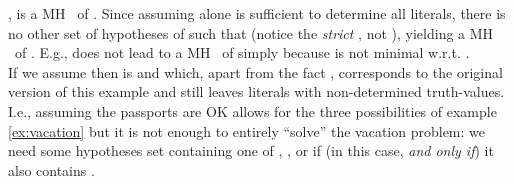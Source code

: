 \documentclass{llncs}
\begin{document}
{{			, is a MH \m\ of .
Since assuming  alone is sufficient to determine all literals, there is no other set of hypotheses  of 
			such that  (notice the \emph{strict} , not ), yielding a MH \m\ of .
			E.g.,  does not lead to a MH \m\ of  simply because  is not minimal w.r.t.
			.\\			
			If we assume  then  is
			and 
			which, apart from the fact , corresponds to the original version of this example and still leaves literals with non-determined
			truth-values.
			I.e., assuming the passports are OK allows for the three possibilities of example \ref{ex:vacation} but it is not enough to entirely ``solve''
			the vacation problem: we need some hypotheses set containing one of , , or  if (in this case, 
			\emph{and only if}) it also contains .
		}
		}
			
\end{document}
